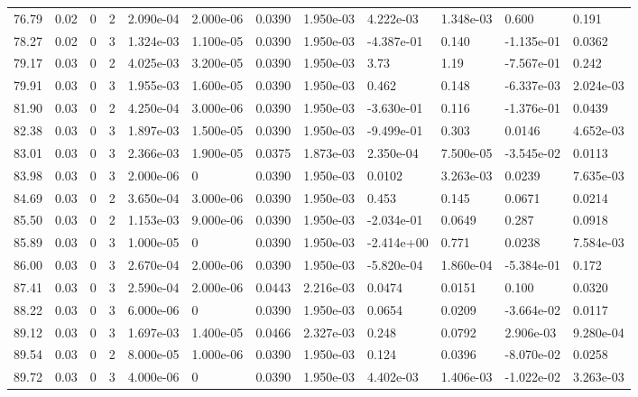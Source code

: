 \documentclass[preview]{standalone}
\begin{document}
{{{{\begin{tabular}{L{1.2cm}C{1.2cm} C{0.3cm}C{0.5cm} C{1.4cm}C{1.4cm} C{1.4cm}C{1.4cm} C{1.6cm}C{1.6cm} C{1.6cm}C{1.6cm}}
  76.79  &  0.02  & 0     &  2 &  2.090e-04  & 2.000e-06  &  0.0390&   1.950e-03& 4.222e-03 & 1.348e-03   &  0.600 & 0.191  \\ 
  78.27  &  0.02  & 0     &  3 &  1.324e-03  & 1.100e-05  &  0.0390&   1.950e-03& -4.387e-01 & 0.140   &  -1.135e-01 & 0.0362  \\ 
  79.17  &  0.03  & 0     &  2 &  4.025e-03  & 3.200e-05  &  0.0390&   1.950e-03& 3.73 & 1.19   &  -7.567e-01 & 0.242  \\ 
  79.91  &  0.03  & 0     &  3 &  1.955e-03  & 1.600e-05  &  0.0390&   1.950e-03& 0.462 & 0.148   &  -6.337e-03 & 2.024e-03  \\ 
  81.90  &  0.03  & 0     &  2 &  4.250e-04  & 3.000e-06  &  0.0390&   1.950e-03& -3.630e-01 & 0.116   &  -1.376e-01 & 0.0439  \\ 
  82.38  &  0.03  & 0     &  3 &  1.897e-03  & 1.500e-05  &  0.0390&   1.950e-03& -9.499e-01 & 0.303   &  0.0146 & 4.652e-03  \\ 
  83.01  &  0.03  & 0     &  3 &  2.366e-03  & 1.900e-05  &  0.0375&   1.873e-03& 2.350e-04 & 7.500e-05   &  -3.545e-02 & 0.0113  \\ 
  83.98  &  0.03  & 0     &  3 &  2.000e-06  & 0  &  0.0390&   1.950e-03& 0.0102 & 3.263e-03   &  0.0239 & 7.635e-03  \\ 
  84.69  &  0.03  & 0     &  2 &  3.650e-04  & 3.000e-06  &  0.0390&   1.950e-03& 0.453 & 0.145   &  0.0671 & 0.0214  \\ 
  85.50  &  0.03  & 0     &  2 &  1.153e-03  & 9.000e-06  &  0.0390&   1.950e-03& -2.034e-01 & 0.0649   &  0.287 & 0.0918  \\ 
  85.89  &  0.03  & 0     &  3 &  1.000e-05  & 0  &  0.0390&   1.950e-03& -2.414e+00 & 0.771   &  0.0238 & 7.584e-03  \\ 
  86.00  &  0.03  & 0     &  3 &  2.670e-04  & 2.000e-06  &  0.0390&   1.950e-03& -5.820e-04 & 1.860e-04   &  -5.384e-01 & 0.172  \\ 
  87.41  &  0.03  & 0     &  3 &  2.590e-04  & 2.000e-06  &  0.0443&   2.216e-03& 0.0474 & 0.0151   &  0.100 & 0.0320  \\ 
  88.22  &  0.03  & 0     &  3 &  6.000e-06  & 0  &  0.0390&   1.950e-03& 0.0654 & 0.0209   &  -3.664e-02 & 0.0117  \\ 
  89.12  &  0.03  & 0     &  3 &  1.697e-03  & 1.400e-05  &  0.0466&   2.327e-03& 0.248 & 0.0792   &  2.906e-03 & 9.280e-04  \\ 
  89.54  &  0.03  & 0     &  2 &  8.000e-05  & 1.000e-06  &  0.0390&   1.950e-03& 0.124 & 0.0396   &  -8.070e-02 & 0.0258  \\ 
  89.72  &  0.03  & 0     &  3 &  4.000e-06  & 0  &  0.0390&   1.950e-03& 4.402e-03 & 1.406e-03   &  -1.022e-02 & 3.263e-03  \\ 
\hline 
\end{tabular} 

}}}}
\end{document}
